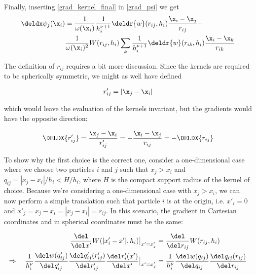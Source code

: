 Finally, inserting \ref{grad_kernel_final} in \ref{grad_psi} we get
\begin{align}
	\deldx \psi_j (\x_i) &=
		\frac{1}{\omega(\x_i)} \frac{1}{h_i^{\nu + 1}} \deldr{w}(r_{ij}, h_i)  \frac{\x_i -
\x_j}{r_{ij}} 	 - \nonumber\\
		& \frac{1}{\omega(\x_i)^2} W(r_{ij}, h_i) \sum_k \frac{1}{h_i^{\nu + 1}} \deldr{w}(r_{ik},
h_i)  \frac{\x_i - \x_k}{r_{ik}}
\end{align}






















The definition of $r_{ij}$ requires a bit more discussion.
Since the kernels are required to be spherically symmetric, we might as well have defined

\begin{align}
r'_{ij} = |\x_j - \x_i |
\end{align}

which would leave the evaluation of the kernels invariant, but the gradients would have the opposite
direction:

\begin{align}
\DELDX{r'_{ij}}
=   \frac{\x_j - \x_i}{r'_{ij}}
= - \frac{\x_i - \x_j}{r_{ij}}
= - \DELDX{r_{ij}}
\end{align}


To show why the first choice is the correct one, consider a one-dimensional case where we choose
two particles $i$ and $j$ such that $x_j > x_i$ and $q_{ij} = | x_j - x_i | / h_i < H / h_i$, where
$H$ is the compact support radius of the kernel of choice.
Because we're considering a one-dimensional case with $x_j > x_i$, we can now perform a simple
translation such that particle $i$ is at the origin, i.e. $x'_i = 0$ and $x'_j = x_j - x_i = | x_j -
x_i | = r_{ij}$.
In this scenario, the gradient in Cartesian coordinates and in spherical coordinates must be the same:


\begin{align}
	\frac{\del}{\del x'} W (|x_i' - x'|, h_i)  \big{|}_{x' = x_j' } &= \frac{\del}{\del r_{ij}} W (r_{ij}, h_i) 		\nonumber\\
%
	\Rightarrow \quad \frac{1}{h_i^\nu} \frac{\del w(q'_{ij})}{\del q'_{ij}} \frac{\del q'_{ij}(r'_{ij})}{\del r'_{ij}} \frac{\del r'_{i}(x')}{\del x'}	  \big{|}_{x' = x_j' }  &=
		\frac{1}{h_i^\nu} \frac{\del w(q_{ij})}{\del q_{ij}} \frac{\del q_{ij}(r_{ij})}{\del r_{ij}}				\label{spher_cart}
\end{align}





